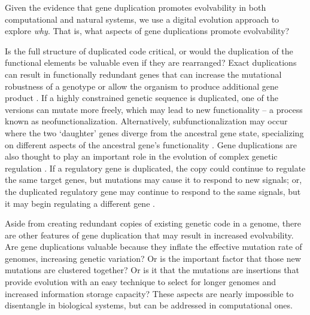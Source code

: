 Given the evidence that gene duplication promotes evolvability in both computational and natural systems, we use a digital evolution approach to explore \textit{why}. That is, what aspects of gene duplications promote evolvability?

Is the full structure of duplicated code critical, or would the duplication of the functional elements be valuable even if they are rearranged? Exact duplications can result in functionally redundant genes that can increase the mutational robustness of a genotype \citep{Crow:2006role} or %
allow the organism to produce
additional gene product %
\citep{Zhang:2003fw}. If a highly constrained genetic sequence is duplicated, one of the versions can mutate more freely, which may lead to new functionality \citep{Zhang:2003fw,Wagner:2003fk} -- a process known as neofunctionalization. Alternatively, subfunctionalization may occur where the two `daughter' genes diverge from the ancestral gene state, specializing on different aspects of the ancestral gene's functionality
\citep{Zhang:2003fw}.
Gene duplications are also thought to play an important role in the evolution of complex genetic regulation \citep{Teichmann:2004cz}. If a regulatory gene is duplicated, the copy could continue to regulate the same target genes, but mutations may cause it to respond to new signals; or, the duplicated regulatory gene may continue to respond to the same signals, but it may begin regulating a different gene \citep{Teichmann:2004cz}.

Aside from creating redundant copies of existing genetic code in a genome, there are other features of gene duplication that may result in increased evolvability. Are gene duplications valuable because they inflate the effective mutation rate of genomes, increasing genetic variation?  Or is the important factor that those new mutations are clustered together?
Or is it that the mutations are insertions that provide evolution with an easy technique to select for longer genomes %
and increased information storage capacity? %
These aspects are nearly impossible to disentangle in biological systems, but can be addressed in computational ones.

